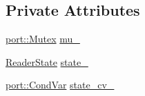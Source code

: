 \subsection*{Private Attributes}
\begin{DoxyCompactItemize}
\item 
\hyperlink{classleveldb_1_1port_1_1_mutex}{port\-::\-Mutex} \hyperlink{classleveldb_1_1_test_state_a52f2e84b88c3c8f7f958a2879dce5f59}{mu\-\_\-}
\item 
\hyperlink{classleveldb_1_1_test_state_a1bf1f0a16815237ff1f29d2925d9a4ad}{Reader\-State} \hyperlink{classleveldb_1_1_test_state_abfbcdedcb6b61445e42231a7d766dc3d}{state\-\_\-}
\item 
\hyperlink{classleveldb_1_1port_1_1_cond_var}{port\-::\-Cond\-Var} \hyperlink{classleveldb_1_1_test_state_a57e246c3b9588ae25bc647cf079e2cdd}{state\-\_\-cv\-\_\-}
\end{DoxyCompactItemize}


